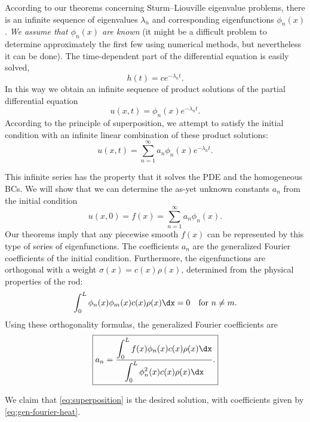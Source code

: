 According to our theorems concerning Sturm--Liouville eigenvalue problems, there is an infinite sequence of eigenvalues $\lambda_n$ and corresponding eigenfunctions $\phi_n(x)$.  \textit{We assume that $\phi_n(x)$ are known} (it might be a difficult problem to determine approximately the first few using numerical methods, but nevertheless it can be done).  The time-dependent part of the differential equation is easily solved,
\begin{equation}
\label{eq:time-solution}
h(t) = ce^{-\lambda_n t}.
\end{equation}
In this way we obtain an infinite sequence of product solutions of the partial differential equation
\begin{equation}
\label{eq:product-solutions}
u(x,t) = \phi_n(x)e^{-\lambda_n t}.
\end{equation}
According to the principle of superposition, we attempt to satisfy the initial condition with an infinite linear combination of these product solutions:
\begin{equation}
\label{eq:superposition}
\boxed{u(x,t) = \sum_{n=1}^{\infty} a_n\phi_n(x)e^{-\lambda_n t}.}
\end{equation}

This infinite series has the property that it solves the PDE and the homogeneous BCs.  We will show that we can determine the as-yet unknown constants $a_n$ from the initial condition
\begin{equation}
\label{eq:initial-expansion}
u(x,0) = f(x) = \sum_{n=1}^{\infty} a_n\phi_n(x).
\end{equation}
Our theorems imply that any piecewise smooth $f(x)$ can be represented by this type of series of eigenfunctions.  The coefficients $a_n$ are the generalized Fourier coefficients of the initial condition.  Furthermore, the eigenfunctions are orthogonal with a weight $\sigma(x) = c(x)\rho(x)$, determined from the physical properties of the rod:
\[
\int_0^L \phi_n(x)\phi_m(x)c(x)\rho(x)\dx = 0 \quad \text{for } n \neq m.
\]
Using these orthogonality formulas, the generalized Fourier coefficients are
\begin{equation}
\label{eq:gen-fourier-heat}
\boxed{a_n = \frac{\displaystyle\int_0^L f(x)\phi_n(x)c(x)\rho(x)\dx}{\displaystyle\int_0^L \phi_n^2(x)c(x)\rho(x)\dx}.}
\end{equation}

We claim that \eqref{eq:superposition} is the desired solution, with coefficients given by \eqref{eq:gen-fourier-heat}.

